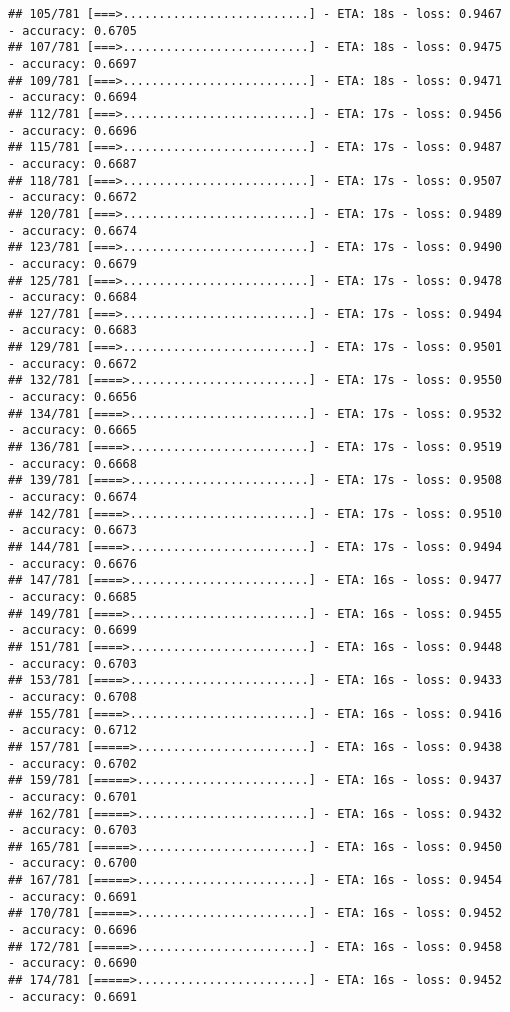 \documentclass[
]{article}
\begin{document}
\begin{verbatim}
## 105/781 [===>..........................] - ETA: 18s - loss: 0.9467 - accuracy: 0.6705
## 107/781 [===>..........................] - ETA: 18s - loss: 0.9475 - accuracy: 0.6697
## 109/781 [===>..........................] - ETA: 18s - loss: 0.9471 - accuracy: 0.6694
## 112/781 [===>..........................] - ETA: 17s - loss: 0.9456 - accuracy: 0.6696
## 115/781 [===>..........................] - ETA: 17s - loss: 0.9487 - accuracy: 0.6687
## 118/781 [===>..........................] - ETA: 17s - loss: 0.9507 - accuracy: 0.6672
## 120/781 [===>..........................] - ETA: 17s - loss: 0.9489 - accuracy: 0.6674
## 123/781 [===>..........................] - ETA: 17s - loss: 0.9490 - accuracy: 0.6679
## 125/781 [===>..........................] - ETA: 17s - loss: 0.9478 - accuracy: 0.6684
## 127/781 [===>..........................] - ETA: 17s - loss: 0.9494 - accuracy: 0.6683
## 129/781 [===>..........................] - ETA: 17s - loss: 0.9501 - accuracy: 0.6672
## 132/781 [====>.........................] - ETA: 17s - loss: 0.9550 - accuracy: 0.6656
## 134/781 [====>.........................] - ETA: 17s - loss: 0.9532 - accuracy: 0.6665
## 136/781 [====>.........................] - ETA: 17s - loss: 0.9519 - accuracy: 0.6668
## 139/781 [====>.........................] - ETA: 17s - loss: 0.9508 - accuracy: 0.6674
## 142/781 [====>.........................] - ETA: 17s - loss: 0.9510 - accuracy: 0.6673
## 144/781 [====>.........................] - ETA: 17s - loss: 0.9494 - accuracy: 0.6676
## 147/781 [====>.........................] - ETA: 16s - loss: 0.9477 - accuracy: 0.6685
## 149/781 [====>.........................] - ETA: 16s - loss: 0.9455 - accuracy: 0.6699
## 151/781 [====>.........................] - ETA: 16s - loss: 0.9448 - accuracy: 0.6703
## 153/781 [====>.........................] - ETA: 16s - loss: 0.9433 - accuracy: 0.6708
## 155/781 [====>.........................] - ETA: 16s - loss: 0.9416 - accuracy: 0.6712
## 157/781 [=====>........................] - ETA: 16s - loss: 0.9438 - accuracy: 0.6702
## 159/781 [=====>........................] - ETA: 16s - loss: 0.9437 - accuracy: 0.6701
## 162/781 [=====>........................] - ETA: 16s - loss: 0.9432 - accuracy: 0.6703
## 165/781 [=====>........................] - ETA: 16s - loss: 0.9450 - accuracy: 0.6700
## 167/781 [=====>........................] - ETA: 16s - loss: 0.9454 - accuracy: 0.6691
## 170/781 [=====>........................] - ETA: 16s - loss: 0.9452 - accuracy: 0.6696
## 172/781 [=====>........................] - ETA: 16s - loss: 0.9458 - accuracy: 0.6690
## 174/781 [=====>........................] - ETA: 16s - loss: 0.9452 - accuracy: 0.6691

\end{verbatim}
\end{document}
